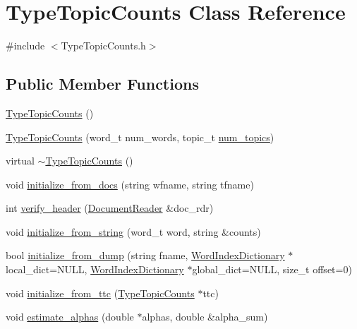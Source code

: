 \hypertarget{class_type_topic_counts}{
\section{TypeTopicCounts Class Reference}
\label{class_type_topic_counts}
}


{\ttfamily \#include $<$TypeTopicCounts.h$>$}

\subsection*{Public Member Functions}
\begin{DoxyCompactItemize}
\item 
\hyperlink{class_type_topic_counts_a461c45af231cb3a4c6c116eb9daa5ee5}{TypeTopicCounts} ()
\item 
\hyperlink{class_type_topic_counts_a199efa3085b514a0e155e24d807fe749}{TypeTopicCounts} (word\_\-t num\_\-words, topic\_\-t \hyperlink{class_type_topic_counts_a11093a2580f604279b5799ef494a8e66}{num\_\-topics})
\item 
virtual \hyperlink{class_type_topic_counts_a96bfd72683e9d117836c6118e62f2957}{$\sim$TypeTopicCounts} ()
\item 
void \hyperlink{class_type_topic_counts_a1e51d6aa7ceb480b3b1e1a2e598a2486}{initialize\_\-from\_\-docs} (string wfname, string tfname)
\item 
int \hyperlink{class_type_topic_counts_adc1724643b2210fce240202fdfc5144c}{verify\_\-header} (\hyperlink{class_document_reader}{DocumentReader} \&doc\_\-rdr)
\item 
void \hyperlink{class_type_topic_counts_a54768567ed8fbf4cd34f2ff7a5222190}{initialize\_\-from\_\-string} (word\_\-t word, string \&counts)
\item 
bool \hyperlink{class_type_topic_counts_a71ca87bf1f9cf612323f792594d3de29}{initialize\_\-from\_\-dump} (string fname, \hyperlink{class_word_index_dictionary}{WordIndexDictionary} $\ast$local\_\-dict=NULL, \hyperlink{class_word_index_dictionary}{WordIndexDictionary} $\ast$global\_\-dict=NULL, size\_\-t offset=0)
\item 
void \hyperlink{class_type_topic_counts_ae8c2f500e74a2f6a6bb1f6e830c66142}{initialize\_\-from\_\-ttc} (\hyperlink{class_type_topic_counts}{TypeTopicCounts} $\ast$ttc)
\item 
void \hyperlink{class_type_topic_counts_af81d800d17306cb9f53e5bfe0ba49094}{estimate\_\-alphas} (double $\ast$alphas, double \&alpha\_\-sum)
\item 

\end{DoxyCompactItemize}
